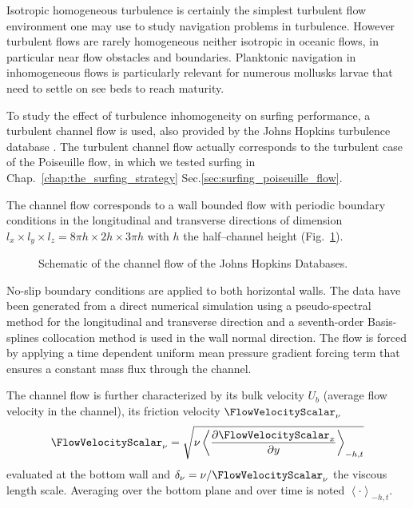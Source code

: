 Isotropic homogeneous turbulence is certainly the simplest turbulent flow environment one may use to study navigation problems in turbulence.
However turbulent flows are rarely homogeneous neither isotropic in oceanic flows, in particular near flow obstacles and boundaries.
Planktonic navigation in inhomogeneous flows is particularly relevant for numerous mollusks larvae that need to settle on see beds to reach maturity.

To study the effect of turbulence inhomogeneity on surfing performance, a turbulent channel flow is used, also provided by the Johns Hopkins turbulence database \citep{li2008public, perlman2007data}.
The turbulent channel flow actually corresponds to the turbulent case of the Poiseuille flow, in which we tested surfing in Chap.~\ref{chap:the_surfing_strategy} Sec.\ref{sec:surfing_poiseuille_flow}.

The channel flow corresponds to a wall bounded flow with periodic boundary conditions in the longitudinal and transverse directions of dimension $l_x \times l_y \times l_z = 8\pi h \times 2 h \times 3 \pi h$ with $h$ the half–channel height (Fig.~\ref{fig:scheme_channel}).
\begin{figure}
	\centering
	\def\svgwidth{0.8\textwidth}
	
  	\caption{
  		Schematic of the channel flow of the Johns Hopkins Databases.
  	}
  	\label{fig:scheme_channel}
\end{figure}
No-slip boundary conditions are applied to both horizontal walls.
The data have been generated from a direct numerical simulation using a pseudo-spectral method for the longitudinal and transverse direction and a seventh-order Basis-splines collocation method is used in the wall normal direction.
The flow is forced by applying a time dependent uniform mean pressure gradient forcing term that ensures a constant mass flux through the channel.

The channel flow is further characterized by its bulk velocity $U_b$ (average flow velocity in the channel), its friction velocity $\FlowVelocityScalar_{\nu}$
\begin{equation}
	\FlowVelocityScalar_{\nu} = \sqrt{\nu \left\langle \frac{\partial \FlowVelocityScalar_x}{\partial y} \right\rangle_{-h,t}}
\end{equation}
evaluated at the bottom wall and $\delta_\nu = \nu / \FlowVelocityScalar_{\nu}$ the viscous length scale.
Averaging over the bottom plane and over time is noted $\left\langle \cdot \right\rangle_{-h,t}$.

